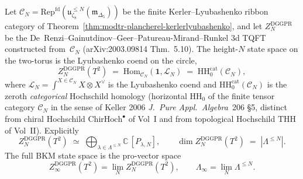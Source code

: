 \begin{theorem}
\label{thm:modtr-zt2-hh0}
Let \(\mathcal C_N =
\mathrm{Rep}^{\mathrm{fd}}(\mathfrak u_{\zeta_8}^{\leq N}
(\widehat{\mathfrak m}_{\Delta_5}))\) be the finite
Kerler--Lyubashenko ribbon category of
Theorem~\ref{thm:modtr-plancherel-kerlerlyubashenko}, and let
\(Z^{\mathrm{DGGPR}}_N\) be the
De~Renzi--Gainutdinov--Geer--Patureau-Mirand--Runkel 3d TQFT
constructed from~\(\mathcal C_N\) (arXiv:2003.09814 Thm.~5.10). The
height-\(N\) state space on the two-torus is the Lyubashenko coend on
the circle,
\[
 Z^{\mathrm{DGGPR}}_N(T^2)
 \;=\;
 \mathrm{Hom}_{\mathcal C_N}(\mathbf 1, \mathcal L_N)
 \;=\;
 \mathrm{HH}_0^{\mathrm{cat}}(\mathcal C_N),
\]
where \(\mathcal L_N=\int^{X\in\mathcal C_N}X\otimes X^\vee\) is the
Lyubashenko coend and \(\mathrm{HH}_0^{\mathrm{cat}}(\mathcal C_N)\) is the
zeroth \emph{categorical} Hochschild homology
(horizontal $\mathrm{HH}_0$ of the finite tensor category $\mathcal C_N$
in the sense of Keller 2006 \emph{J.~Pure Appl.\ Algebra}~206 \S5,
distinct from chiral Hochschild $\mathrm{ChirHoch}^\bullet$ of Vol~I
and from topological Hochschild $\mathrm{THH}$ of Vol~II). Explicitly
\[
 Z^{\mathrm{DGGPR}}_N(T^2)
 \;\simeq\;
 \bigoplus_{\lambda\in\Lambda^{\leq N}}\mathbb C\,
 [P_{\lambda,N}],
 \qquad
 \dim Z^{\mathrm{DGGPR}}_N(T^2)
 \;=\;
 |\Lambda^{\leq N}|.
\]
The full BKM state space is the pro-vector space
\[
 Z^{\mathrm{DGGPR}}_\infty(T^2)=\lim_N Z^{\mathrm{DGGPR}}_N(T^2),
 \qquad
 \Lambda_\infty=\lim_N\Lambda^{\leq N}.
\]
\end{theorem}

